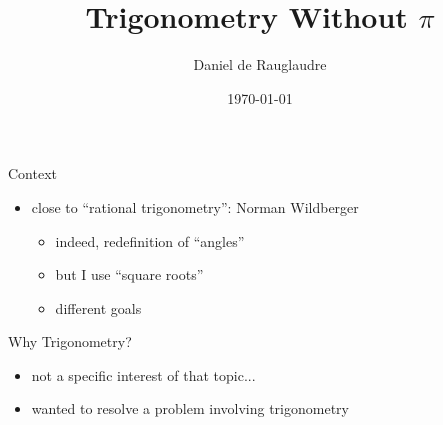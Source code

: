 \documentclass{beamer}
\title{Trigonometry Without $\pi$}
\author{Daniel de Rauglaudre}
\date{\today}
\begin{document}
\begin{frame}
    \titlepage
\end{frame}

\begin{frame}{}
\end{frame}

\begin{frame}{Context}
  \begin{itemize}
    \item close to ``rational trigonometry'':  Norman Wildberger
      \begin{itemize}
      \item indeed, redefinition of ``angles''
      \item but I use ``square roots''
      \item different goals
      \end{itemize}
  \end{itemize}
\end{frame}

\begin{frame}{Why Trigonometry?}
  \begin{itemize}
  \item not a specific interest of that topic...
  \item wanted to resolve a problem involving trigonometry
  \end{itemize}
\end{frame}

\begin{frame}{}
\end{frame}
\end{document}
